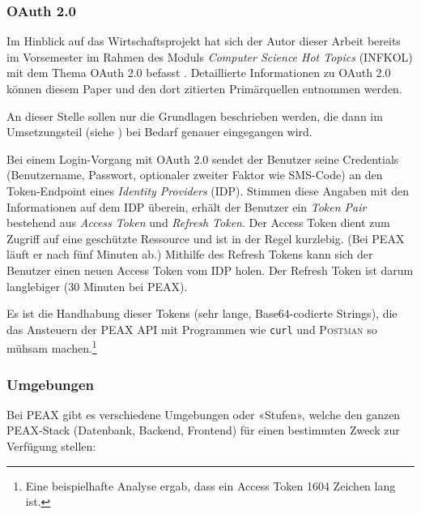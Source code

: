 \subsubsection{OAuth 2.0}

Im Hinblick auf das Wirtschaftsprojekt hat sich der Autor dieser Arbeit bereits im Vorsemester im Rahmen des Moduls \textit{Computer Science Hot Topics} (INFKOL) mit dem Thema OAuth 2.0 befasst \cite{infkol-oauth}. Detaillierte Informationen zu OAuth 2.0 können diesem Paper und den dort zitierten Primärquellen entnommen werden.

An dieser Stelle sollen nur die Grundlagen beschrieben werden, die dann im Umsetzungsteil (siehe ) bei Bedarf genauer eingegangen wird.

Bei einem Login-Vorgang mit OAuth 2.0 sendet der Benutzer seine Credentials (Benutzername, Passwort, optionaler zweiter Faktor wie SMS-Code) an den Token-Endpoint eines \textit{Identity Providers} (IDP). Stimmen diese Angaben mit den Informationen auf dem IDP überein, erhält der Benutzer ein \textit{Token Pair} bestehend aus \textit{Access Token} und \textit{Refresh Token}. Der Access Token dient zum Zugriff auf eine geschützte Ressource und ist in der Regel kurzlebig. (Bei PEAX läuft er nach fünf Minuten ab.) Mithilfe des Refresh Tokens kann sich der Benutzer einen neuen Access Token vom IDP holen. Der Refresh Token ist darum langlebiger (30 Minuten bei PEAX).

Es ist die Handhabung dieser Tokens (sehr lange, Base64-codierte Strings), die das Ansteuern der PEAX API mit Programmen wie \texttt{curl} und \textsc{Postman} so mühsam machen.\footnote{Eine beispielhafte Analyse ergab, dass ein Access Token 1604 Zeichen lang ist.}

\subsubsection{Umgebungen}

Bei PEAX gibt es verschiedene Umgebungen oder «Stufen», welche den ganzen PEAX-Stack (Datenbank, Backend, Frontend) für einen bestimmten Zweck zur Verfügung stellen:

